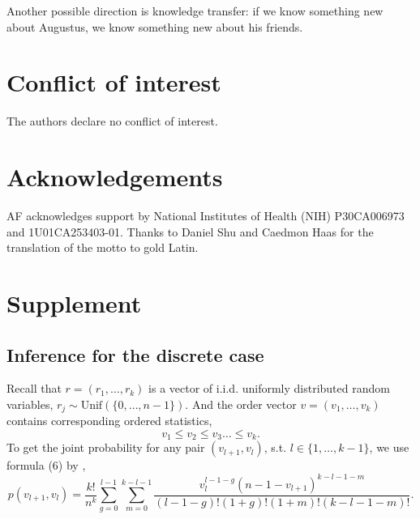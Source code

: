 \documentclass{llncs}
\begin{document}
Another possible direction is knowledge transfer: if we know something new about Augustus, we know something new about his friends. 




\section{Conflict of interest}
The authors declare no conflict of interest.

\section{Acknowledgements}
AF acknowledges support by National Institutes of Health (NIH) P30CA006973 and 1U01CA253403-01.
Thanks to Daniel Shu and Caedmon Haas for the translation of the motto to gold Latin. 





\newcommand{\beginsupplement}{%
        \setcounter{table}{0}
        \renewcommand{\thetable}{S\arabic{table}}%
        \setcounter{figure}{0}
        \renewcommand{\thefigure}{S\arabic{figure}}
        \setcounter{equation}{0}
        \renewcommand{\theequation}{S\arabic{equation}}%
     }

\newpage
\section*{Supplement}
\beginsupplement
\subsection{Inference for the discrete case} 
\label{appendix:discreet_case}
Recall that $r = (r_1, \dots, r_k)$ is a vector of i.i.d. uniformly distributed random variables, $r_j \sim \text{Unif}(\{0, \dots, n-1\})$. And the order vector $v = (v_1, \dots, v_k)$ contains corresponding ordered statistics,
\[
v_1 \leq v_2 \leq v_3 \dots \leq v_k.
\]
To get the joint probability for any pair $(v_{l+1}, v_l)$, s.t. $l\in\{1, \dots, k-1\}$, we use formula (6) by \cite{khatri1962distributions}, 
\begin{equation}
\label{eq:joint_distribution}
p(v_{l+1}, v_l) = \frac{k!}{n^k} 
\sum^{l-1}_{g=0}\sum^{k-l-1}_{m=0}
\frac{v^{l-1-g}_l (n-1 - v_{l+1})^{k-l-1-m}}{(l-1-g)!(1+g)!(1+m)!(k-l-1-m)!}.
\end{equation}
\end{document}
